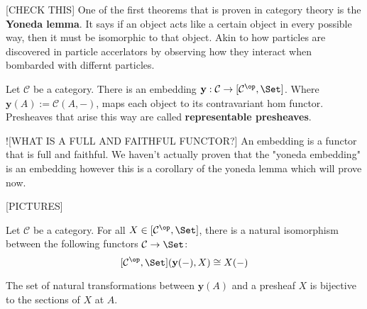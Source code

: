 
[CHECK THIS] One of the first theorems that is proven in category theory is the \textbf{Yoneda lemma}. It says if an object acts like a certain object in every possible way, then it must be isomorphic to that object. Akin to how particles are discovered in particle accerlators by observing how they interact when bombarded with differnt particles.

\begin{lemma}
    Let $\mathcal{C}$ be a category. There is an embedding $\mathbf{y} : \mathcal{C} \to [\mathcal{C}^\op, \Set]$. 
    Where $\mathbf{y}(A) := \mathcal{C}( A, - )$, maps each object to its contravariant hom functor. 
    Presheaves that arise this way are called \textbf{representable presheaves}.
\end{lemma}

\begin{remark}
    ![WHAT IS A FULL AND FAITHFUL FUNCTOR?]
    An embedding is a functor that is full and faithful. We haven't actually proven that the "yoneda embedding" is an embedding however this is a corollary of the yoneda lemma which will prove now.
\end{remark}

[PICTURES]

\begin{theorem}
    Let $\mathcal{C}$ be a category. For all $X \in [\mathcal{C}^\op, \Set]$, there is a natural isomorphism between the following functors $\mathcal{C} \to \Set$:
        $$[\mathcal{C}^\op, \Set](\mathbf{y}(-), X) \cong X(-)$$
\end{theorem}

\begin{remark}
    The set of natural transformations between $\mathbf{y}(A)$ and a presheaf $X$ is bijective to the sections of $X$ at $A$.
\end{remark}



